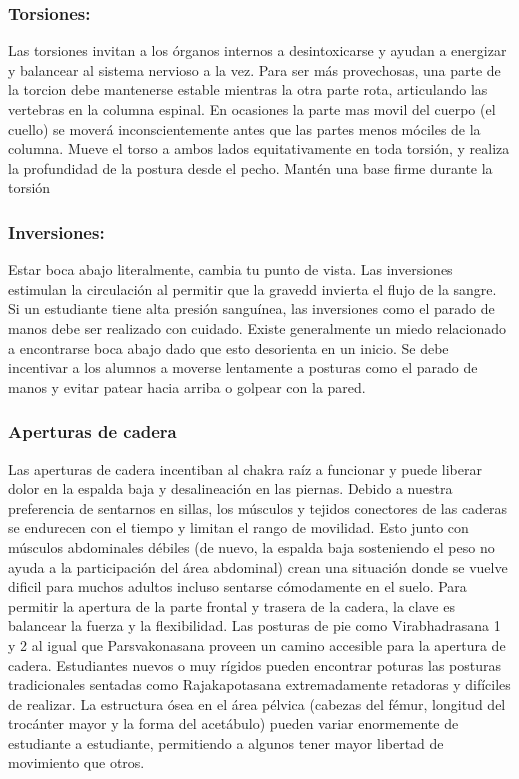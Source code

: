 \subsubsection{Torsiones:}
Las torsiones invitan a los órganos internos a desintoxicarse y ayudan a energizar y balancear al sistema nervioso a la vez. Para ser más provechosas, una parte de la torcion debe mantenerse estable mientras la otra parte rota, articulando las vertebras en la columna espinal. En ocasiones la parte mas movil del cuerpo (el cuello) se moverá inconscientemente antes que las partes menos móciles de la columna. Mueve el torso a ambos lados equitativamente en toda torsión, y realiza la profundidad de la postura desde el pecho. Mantén una base firme  durante la torsión

\subsubsection{Inversiones:}
Estar boca abajo literalmente, cambia tu punto de vista. Las inversiones estimulan la circulación al permitir que la gravedd invierta el flujo de la sangre. Si un estudiante tiene alta presión sanguínea, las inversiones como el parado de manos debe ser realizado con cuidado. Existe generalmente un miedo relacionado a encontrarse boca abajo dado que esto desorienta en un inicio. Se debe incentivar a los alumnos a moverse lentamente a posturas como el parado de manos y evitar patear hacia arriba o golpear con la pared.

\subsubsection{Aperturas de cadera}
Las aperturas de cadera incentiban al chakra raíz a funcionar y puede liberar dolor en la espalda baja y desalineación en las piernas. Debido a nuestra preferencia de sentarnos en sillas, los músculos y tejidos conectores de las caderas se endurecen con el tiempo y limitan el rango de movilidad. Esto junto con músculos abdominales débiles (de nuevo, la espalda baja sosteniendo el peso no ayuda a la participación del área abdominal) crean una situación donde se vuelve dificil para muchos adultos incluso sentarse cómodamente en el suelo. Para permitir la apertura de la parte frontal y trasera de la cadera, la clave es balancear la fuerza y la flexibilidad. Las posturas de pie como Virabhadrasana 1 y 2 al igual que Parsvakonasana proveen un camino accesible para la apertura de cadera. Estudiantes nuevos o muy rígidos pueden encontrar poturas las posturas tradicionales sentadas como Rajakapotasana extremadamente retadoras y difíciles de realizar. La estructura ósea en el área pélvica (cabezas del fémur, longitud del trocánter mayor y la forma del acetábulo) pueden variar enormemente de estudiante a estudiante, permitiendo a algunos tener mayor libertad de movimiento que otros.

